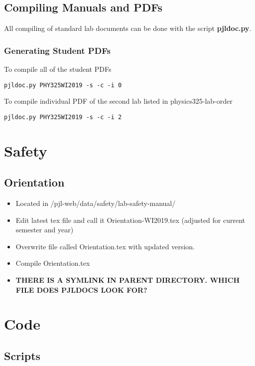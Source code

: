 \documentclass[justified]{book}
\begin{document}
\section{Compiling Manuals and PDFs}

All compiling of standard lab documents can be done with the script {\bf pjldoc.py}.

\subsection{Generating Student PDFs}

To compile all of the student PDFs

\begin{lstlisting}
pjldoc.py PHY325WI2019 -s -c -i 0        
\end{lstlisting}


To compile individual PDF of the second lab listed in physics325-lab-order

\begin{lstlisting}
pjldoc.py PHY325WI2019 -s -c -i 2
\end{lstlisting}

\chapter{Safety}

\section{Orientation}
\begin{itemize}
\item Located in /pjl-web/data/safety/lab-safety-manual/
\item Edit latest tex file and call it Orientation-WI2019.tex (adjusted for current semester and year)
\item Overwrite file called Orientation.tex with updated version. 
\item Compile Orientation.tex
\item {\bf THERE IS A SYMLINK IN PARENT DIRECTORY. WHICH FILE DOES PJLDOCS LOOK FOR?}
\end{itemize}

\chapter{Code}

\section{Scripts}
\end{document}
